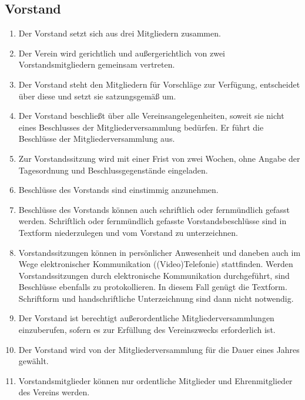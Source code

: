 \documentclass[12pt,a4paper,draft]{article}
\begin{document}
\subsection{Vorstand} %
\begin{enumerate}
\item Der Vorstand setzt sich aus drei Mitgliedern zusammen. %

\item Der Verein wird gerichtlich und außergerichtlich von zwei 
Vorstandsmitgliedern gemeinsam vertreten.

\item Der Vorstand steht den Mitgliedern für Vorschläge zur Verfügung, 
entscheidet über diese und setzt sie satzungsgemäß um.

\item Der Vorstand beschließt über alle Vereinsangelegenheiten, soweit sie 
nicht eines Beschlusses der Mitgliederversammlung bedürfen. Er führt die 
Beschlüsse der Mitgliederversammlung aus.

\item Zur Vorstandssitzung wird mit einer Frist von zwei Wochen, ohne
Angabe der Tagesordnung und Beschlussgegenstände eingeladen.

\item Beschlüsse des Vorstands sind einstimmig anzunehmen.

\item Beschlüsse des Vorstands können auch schriftlich oder fernmündlich 
gefasst werden. Schriftlich oder fernmündlich gefasste Vorstandsbeschlüsse 
sind in Textform niederzulegen und vom Vorstand zu unterzeichnen.

\item Vorstandssitzungen können in persönlicher Anwesenheit und daneben auch im
Wege elektronischer Kommunikation ((Video)Telefonie) stattfinden. Werden Vorstandssitzungen
durch elektronische Kommunikation durchgeführt, sind Beschlüsse ebenfalls zu protokollieren.
In diesem Fall genügt die Textform. Schriftform und handschriftliche Unterzeichnung
sind dann nicht notwendig.

\item Der Vorstand ist berechtigt außerordentliche Mitgliederversammlungen 
einzuberufen, sofern es zur Erfüllung des Vereinszwecks erforderlich ist.

\item Der Vorstand wird von der Mitgliederversammlung für die Dauer eines 
Jahres gewählt.

\item Vorstandsmitglieder können nur ordentliche Mitglieder und Ehrenmitglieder 
des Vereins werden.


\end{enumerate}
\end{document}
